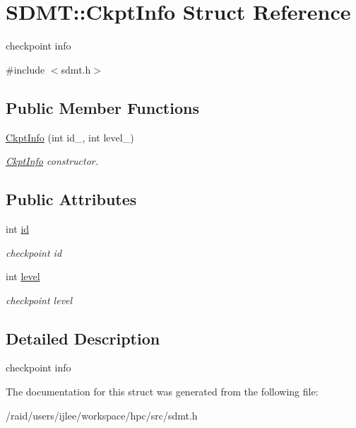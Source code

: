 \hypertarget{struct_s_d_m_t_1_1_ckpt_info}{}\section{S\+D\+MT\+:\+:Ckpt\+Info Struct Reference}
\label{struct_s_d_m_t_1_1_ckpt_info}


checkpoint info  




{\ttfamily \#include $<$sdmt.\+h$>$}

\subsection*{Public Member Functions}
\begin{DoxyCompactItemize}
\item 
\hyperlink{struct_s_d_m_t_1_1_ckpt_info_a2556be85ca8c498984a94f9e4631ee9a}{Ckpt\+Info} (int id\+\_\+, int level\+\_\+)\hypertarget{struct_s_d_m_t_1_1_ckpt_info_a2556be85ca8c498984a94f9e4631ee9a}{}\label{struct_s_d_m_t_1_1_ckpt_info_a2556be85ca8c498984a94f9e4631ee9a}

\begin{DoxyCompactList}\small\item\em \hyperlink{struct_s_d_m_t_1_1_ckpt_info}{Ckpt\+Info} constructor. \end{DoxyCompactList}\end{DoxyCompactItemize}
\subsection*{Public Attributes}
\begin{DoxyCompactItemize}
\item 
int \hyperlink{struct_s_d_m_t_1_1_ckpt_info_aeb67008d2f1294435c1a07a22ad691ff}{id}\hypertarget{struct_s_d_m_t_1_1_ckpt_info_aeb67008d2f1294435c1a07a22ad691ff}{}\label{struct_s_d_m_t_1_1_ckpt_info_aeb67008d2f1294435c1a07a22ad691ff}

\begin{DoxyCompactList}\small\item\em checkpoint id \end{DoxyCompactList}\item 
int \hyperlink{struct_s_d_m_t_1_1_ckpt_info_a552a2b7a4cb67498389e41b9dbc93a87}{level}\hypertarget{struct_s_d_m_t_1_1_ckpt_info_a552a2b7a4cb67498389e41b9dbc93a87}{}\label{struct_s_d_m_t_1_1_ckpt_info_a552a2b7a4cb67498389e41b9dbc93a87}

\begin{DoxyCompactList}\small\item\em checkpoint level \end{DoxyCompactList}\end{DoxyCompactItemize}


\subsection{Detailed Description}
checkpoint info 

The documentation for this struct was generated from the following file\+:\begin{DoxyCompactItemize}
\item 
/raid/users/ijlee/workspace/hpc/src/sdmt.\+h\end{DoxyCompactItemize}
